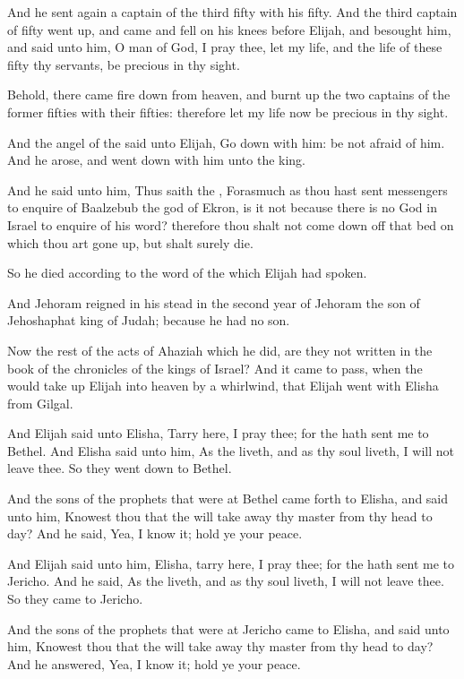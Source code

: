\Verse And he sent again a captain of the third fifty with his fifty.  And the third captain of fifty went up, and came and fell on his knees before Elijah, and besought him, and said unto him, O man of God, I pray thee, let my life, and the life of these fifty thy servants, be precious in thy sight.

\Verse Behold, there came fire down from heaven, and burnt up the two captains of the former fifties with their fifties: therefore let my life now be precious in thy sight.

\Verse And the angel of the \LORD said unto Elijah, Go down with him: be not afraid of him. And he arose, and went down with him unto the king.

\Verse And he said unto him, Thus saith the \LORD, Forasmuch as thou hast sent messengers to enquire of Baalzebub the god of Ekron, is it not because there is no God in Israel to enquire of his word? therefore thou shalt not come down off that bed on which thou art gone up, but shalt surely die.

\Verse So he died according to the word of the \LORD which Elijah had spoken.

And Jehoram reigned in his stead in the second year of Jehoram the son of Jehoshaphat king of Judah; because he had no son.

\Verse Now the rest of the acts of Ahaziah which he did, are they not written in the book of the chronicles of the kings of Israel?  
\Chapter
\Verse And it came to pass, when the \LORD would take up Elijah into heaven by a whirlwind, that Elijah went with Elisha from Gilgal.

\Verse And Elijah said unto Elisha, Tarry here, I pray thee; for the \LORD hath sent me to Bethel. And Elisha said unto him, As the \LORD liveth, and as thy soul liveth, I will not leave thee. So they went down to Bethel.

\Verse And the sons of the prophets that were at Bethel came forth to Elisha, and said unto him, Knowest thou that the \LORD will take away thy master from thy head to day? And he said, Yea, I know it; hold ye your peace.

\Verse And Elijah said unto him, Elisha, tarry here, I pray thee; for the \LORD hath sent me to Jericho. And he said, As the \LORD liveth, and as thy soul liveth, I will not leave thee. So they came to Jericho.

\Verse And the sons of the prophets that were at Jericho came to Elisha, and said unto him, Knowest thou that the \LORD will take away thy master from thy head to day? And he answered, Yea, I know it; hold ye your peace.

